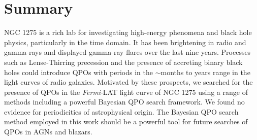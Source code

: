 \documentclass{iau}
\begin{document}

\section{Summary}

NGC 1275 is a rich lab for investigating high-energy phenomena and black hole physics, particularly in the time domain. It has been  brightening in radio and gamma-rays and displayed gamma-ray flares over the last nine years. %
Processes such as Lense-Thirring precession and the presence of accreting binary black holes could introduce QPOs with periods in the $\sim$months to years range in the light curves of radio galaxies. Motivated by these prospects, we searched for the presence of QPOs in the \textit{Fermi}-LAT light curve of NGC 1275 using a range of methods including a powerful Bayesian QPO search framework. We found no evidence for periodicities of astrophysical origin. The Bayesian QPO search method employed in this work should be a powerful tool for future searches of QPOs in AGNs and blazars.
\end{document}
